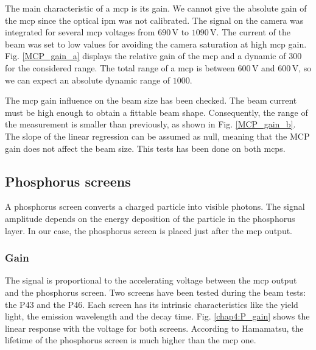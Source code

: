 \begin{refsection}
  The main characteristic of a \acrshort{mcp} is its gain. We cannot give the absolute gain of the \acrshort{mcp} since the optical \acrshort{ipm} was not calibrated. The signal on the camera was integrated for several \acrshort{mcp} voltages from $690\,\mathrm{V}$ to $1090\,\mathrm{V}$. The current of the beam was set to low values for avoiding the camera saturation at high \acrshort{mcp} gain. Fig. \ref{MCP_gain_a} displays the relative gain of the \acrshort{mcp} and a dynamic of $300$ for the considered range. The total range of a \acrshort{mcp} is between $600\,\mathrm{V}$ and $600\,\mathrm{V}$, so we can expect an absolute dynamic range of $1000$.

  The \acrshort{mcp} gain influence on the beam size has been checked. The beam current must be high enough to obtain a fittable beam shape. Consequently, the range of the measurement is smaller than previously, as shown in Fig. \ref{MCP_gain_b}. The slope of the linear regression can be assumed as null, meaning that the MCP gain does not affect the beam size. This tests has been done on both \acrshort{mcp}s.

  

  \subsection{Phosphorus screens}

  A phosphorus screen converts a charged particle into visible photons.
  The signal amplitude depends on the energy deposition of the particle in the phosphorus layer. In our case, the phosphorus screen is placed just after the \acrshort{mcp} output.

  \subsubsection{Gain}

  The signal is proportional to the accelerating voltage between the \acrshort{mcp} output and the phosphorus screen. Two screens have been tested during the beam tests: the P43 and the P46. Each screen has its intrinsic characteristics like the yield light, the emission wavelength and the decay time. Fig. \ref{chap4:P_gain} shows the linear response with the voltage for both screens. According to Hamamatsu, the lifetime of the phosphorus screen is much higher than the \acrshort{mcp} one.

  


\end{refsection}
